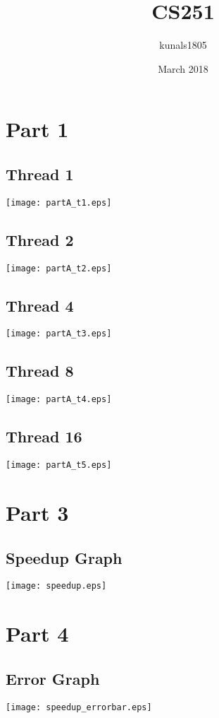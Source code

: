 \documentclass{article}
\title{CS251}
\author{kunals1805 }
\date{March 2018}
\begin{document}
\maketitle

\section{Part 1}
\subsection{Thread 1}
\texttt{[image: partA\_t1.eps]}
\subsection{Thread 2}
\texttt{[image: partA\_t2.eps]}
\subsection{Thread 4}
\texttt{[image: partA\_t3.eps]}
\subsection{Thread 8}
\texttt{[image: partA\_t4.eps]}
\subsection{Thread 16}
\texttt{[image: partA\_t5.eps]}
\section{Part 3}
\subsection{Speedup Graph}
\texttt{[image: speedup.eps]}
\section{Part 4}
\subsection{Error Graph}
\texttt{[image: speedup\_errorbar.eps]}
\end{document}
